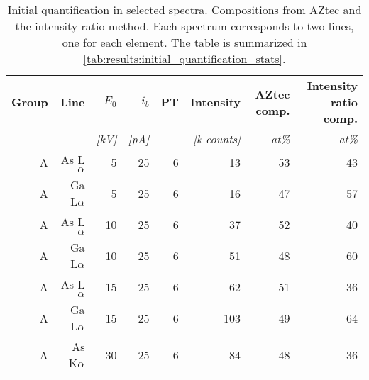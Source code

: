 
\begin{table}[phtb]
    \begin{center}
        \caption{
            Initial quantification in selected spectra.
            Compositions from AZtec and the intensity ratio method.
            Each spectrum corresponds to two lines, one for each element.
            The table is summarized in \cref{tab:results:initial_quantification_stats}.
        }
        \label{tab:results:initial_quantification}
        \begin{tabular}{rrrrrrrr}
            \hline
            \textbf{ Group} & \textbf{Line} & \textbf{$E_0$} & \textbf{$i_b$} & \textbf{PT} & \textbf{Intensity} & \textbf{AZtec comp.} & \textbf{Intensity ratio comp.} \\
            \emph{}         & \emph{}       & \emph{[kV]}    & \emph{[pA]}    & \emph{}     & \emph{[k counts]}  & \emph{at\%}          & \emph{at\%}                    \\
            \hline
            A               & As L$\alpha$  & 5              & 25             & 6           & 13                 & 53                   & 43                             \\
            A               & Ga L$\alpha$  & 5              & 25             & 6           & 16                 & 47                   & 57                             \\
            A               & As L$\alpha$  & 10             & 25             & 6           & 37                 & 52                   & 40                             \\
            A               & Ga L$\alpha$  & 10             & 25             & 6           & 51                 & 48                   & 60                             \\
            A               & As L$\alpha$  & 15             & 25             & 6           & 62                 & 51                   & 36                             \\
            A               & Ga L$\alpha$  & 15             & 25             & 6           & 103                & 49                   & 64                             \\
            A               & As K$\alpha$  & 30             & 25             & 6           & 84                 & 48                   & 36                             \\

\end{tabular}
\end{center}
\end{table}
